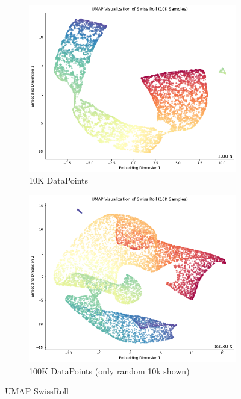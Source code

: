 \begin{itemize}
\begin{itemize}
            \begin{figure}[H]
                \begin{subfigure}{0.5\textwidth}
                    \centering
                    \captionsetup{justification=centering}
                    \includegraphics[width=\textwidth]{images/umap_swiss10k.png}
                    \caption{10K DataPoints}
                    \label{fig:umap_swiss10k}
                \end{subfigure}
                \begin{subfigure}{0.5\textwidth}
                    \centering
                    \captionsetup{justification=centering}
                    \includegraphics[width=\textwidth]{images/umap_swiss100k.png}
                    \caption{100K DataPoints (only random 10k shown)}
                    \label{fig:umap_swiss100k}
                \end{subfigure}
                \caption{UMAP SwissRoll}
                \label{fig:umap_swiss}
            \end{figure}


\end{itemize}
\end{itemize}
